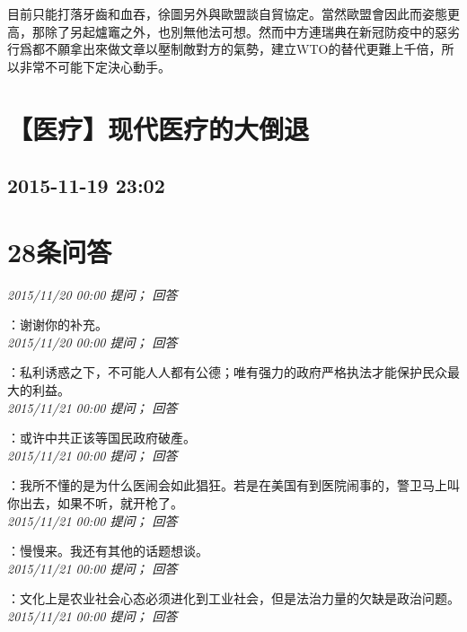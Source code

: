 \documentclass[twocolumn]{ctexart}
\begin{document}
目前只能打落牙齒和血吞，徐圖另外與歐盟談自貿協定。當然歐盟會因此而姿態更高，那除了另起爐竈之外，也別無他法可想。然而中方連瑞典在新冠防疫中的惡劣行爲都不願拿出來做文章以壓制敵對方的氣勢，建立WTO的替代更難上千倍，所以非常不可能下定決心動手。
\\


\section{【医疗】现代医疗的大倒退}
\subsection{2015-11-19 23:02}


\section{28条问答}

\textit{\hfill\noindent\small 2015/11/20 00:00 提问； 回答}

：谢谢你的补充。\\

\textit{\hfill\noindent\small 2015/11/20 00:00 提问； 回答}

：私利诱惑之下，不可能人人都有公德；唯有强力的政府严格执法才能保护民众最大的利益。\\

\textit{\hfill\noindent\small 2015/11/21 00:00 提问； 回答}

：或许中共正该等国民政府破產。\\

\textit{\hfill\noindent\small 2015/11/21 00:00 提问； 回答}

：我所不懂的是为什么医闹会如此猖狂。若是在美国有到医院闹事的，警卫马上叫你出去，如果不听，就开枪了。\\

\textit{\hfill\noindent\small 2015/11/21 00:00 提问； 回答}

：慢慢来。我还有其他的话题想谈。\\

\textit{\hfill\noindent\small 2015/11/21 00:00 提问； 回答}

：文化上是农业社会心态必须进化到工业社会，但是法治力量的欠缺是政治问题。\\

\textit{\hfill\noindent\small 2015/11/21 00:00 提问； 回答}
\end{document}
